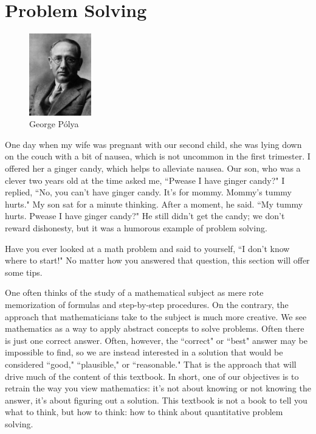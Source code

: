 \section{Problem Solving}
\label{sec:polya}

\begin{figure}
\vspace{-10pt} 
 \centering
    \includegraphics[width=0.24\textwidth]{img/chap0/polya.jpg}
  \caption{George P\'{o}lya}
\vspace{-10pt}
\end{figure}

One day when my wife was pregnant with our second child, she was lying down on the couch with a bit of nausea, which is not uncommon in the first trimester. I offered her a ginger candy, which helps to alleviate nausea. Our son, who was a clever two years old at the time asked me, ``Pwease I have ginger candy?" I replied, ``No, you can't have ginger candy. It's for mommy. Mommy's tummy hurts." My son sat for a minute thinking. After a moment, he said. ``My tummy hurts. Pwease I have ginger candy?" He still didn't get the candy; we don't reward dishonesty, but it was a humorous example of problem solving.

Have you ever looked at a math problem and said to yourself, ``I don't know where to start!" No matter how you answered that question, this section will offer some tips.

One often thinks of the study of a mathematical subject as mere rote memorization of formulas and step-by-step procedures. On the contrary, the approach that mathematicians take to the subject is much more creative. We see mathematics as a way to apply abstract concepts to solve problems. Often there is just one correct answer. Often, however, the ``correct" or ``best" answer may be impossible to find, so we are instead interested in a solution that would be considered ``good," ``plausible," or ``reasonable." That is the approach that will drive much of the content of this textbook. In short, one of our objectives is to retrain the way you view mathematics: it's not about knowing or not knowing the answer, it's about figuring out a solution. This textbook is not a book to tell you what to think, but how to think: how to think about quantitative problem solving.

